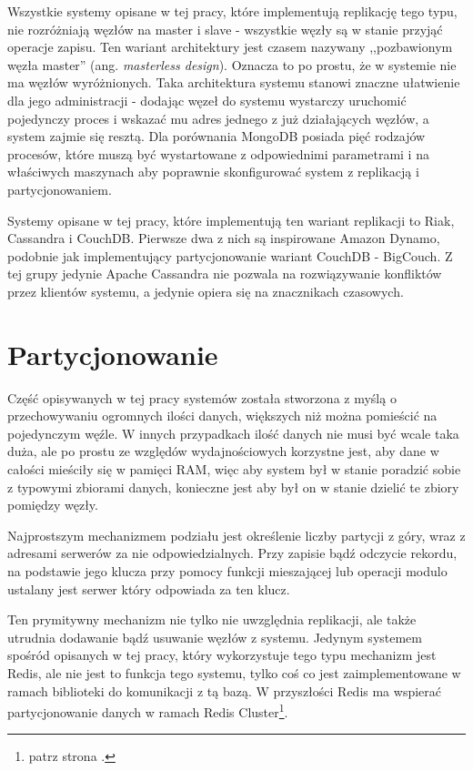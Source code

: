 Wszystkie systemy opisane w tej pracy, które implementują replikację tego typu, nie rozróżniają węzłów na master i slave - wszystkie węzły są w stanie przyjąć operacje zapisu.
Ten wariant architektury jest czasem nazywany ,,pozbawionym węzła master'' (ang. \emph{masterless design}).
Oznacza to po prostu, że w systemie nie ma węzłów wyróżnionych.
Taka architektura systemu stanowi znaczne ułatwienie dla jego administracji - dodając węzeł do systemu wystarczy uruchomić pojedynczy proces i wskazać mu adres jednego z już działających węzłów, a system zajmie się resztą.
Dla porównania MongoDB posiada pięć rodzajów procesów, które muszą być wystartowane z odpowiednimi parametrami i na właściwych maszynach aby poprawnie skonfigurować system z replikacją i partycjonowaniem.

Systemy opisane w tej pracy, które implementują ten wariant replikacji to Riak, Cassandra i CouchDB.
Pierwsze dwa z nich są inspirowane Amazon Dynamo, podobnie jak implementujący partycjonowanie wariant CouchDB - BigCouch.
Z tej grupy jedynie Apache Cassandra nie pozwala na rozwiązywanie konfliktów przez klientów systemu, a jedynie opiera się na znacznikach czasowych.

\section{Partycjonowanie}

Część opisywanych w tej pracy systemów została stworzona z myślą o przechowywaniu ogromnych ilości danych, większych niż można pomieścić na pojedynczym węźle.
W innych przypadkach ilość danych nie musi być wcale taka duża, ale po prostu ze względów wydajnościowych korzystne jest, aby dane w całości mieściły się w pamięci RAM, więc aby system był w stanie poradzić sobie z typowymi zbiorami danych, konieczne jest aby był on w stanie dzielić te zbiory pomiędzy węzły.

Najprostszym mechanizmem podziału jest określenie liczby partycji z góry, wraz z adresami serwerów za nie odpowiedzialnych.
Przy zapisie bądź odczycie rekordu, na podstawie jego klucza przy pomocy funkcji mieszającej lub operacji modulo ustalany jest serwer który odpowiada za ten klucz.

Ten prymitywny mechanizm nie tylko nie uwzględnia replikacji, ale także utrudnia dodawanie bądź usuwanie węzłów z systemu.
Jedynym systemem spośród opisanych w tej pracy, który wykorzystuje tego typu mechanizm jest Redis, ale nie jest to funkcja tego systemu, tylko coś co jest zaimplementowane w ramach biblioteki do komunikacji z tą bazą.
W przyszłości Redis ma wspierać partycjonowanie danych w ramach Redis Cluster\footnote{patrz strona \pageref{sec:redis-cluster}.}.

